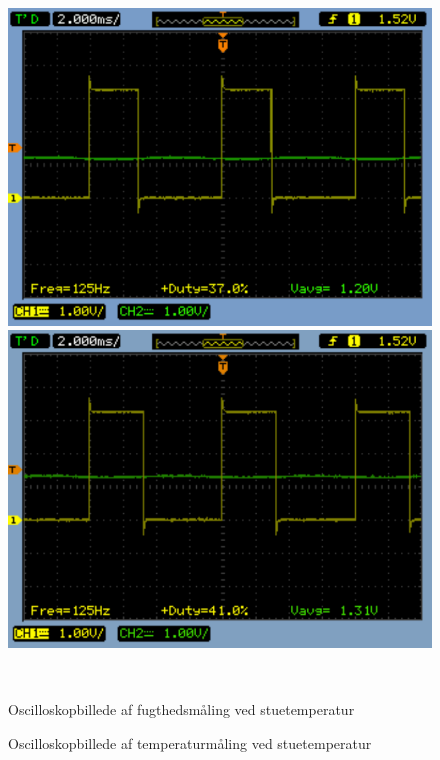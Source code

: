 \begin{figure}[H] \centering
\begin{minipage}[b]{0.48\textwidth} \centering
\includegraphics[width=1.00\textwidth]{filer/modultest/Billeder/SCOP_humidSTUETEMP} %
\end{minipage} \hfill
\begin{minipage}[b]{0.48\textwidth} \centering
\includegraphics[width=1.00\textwidth]{filer/modultest/Billeder/SCOP_tempSTUETEMP} %
\end{minipage} \\ %
\begin{minipage}[t]{0.48\textwidth}
\caption{Oscilloskopbillede af fugthedsmåling ved stuetemperatur} %
\label{fig:SCOP_FUGT_STUE}
\end{minipage} \hfill
\begin{minipage}[t]{0.48\textwidth}
\caption{Oscilloskopbillede af temperaturmåling ved stuetemperatur} %
\label{fig:SCOP_TEMP_STUE}
\end{minipage}
\end{figure}

